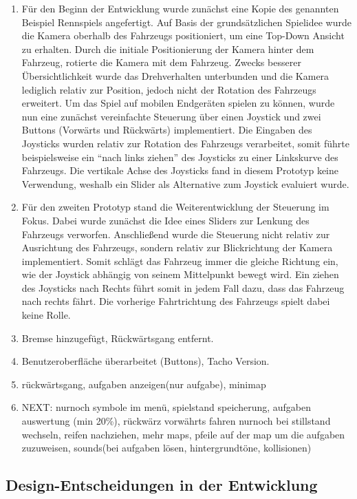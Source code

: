 	\begin{enumerate}[label=Prototyp \arabic*]
		\item{Für den Beginn der Entwicklung wurde zunächst eine Kopie des genannten Beispiel Rennspiels angefertigt. Auf Basis der grundsätzlichen Spielidee wurde die Kamera oberhalb des Fahrzeugs positioniert, um eine Top-Down Ansicht zu erhalten. Durch die initiale Positionierung der Kamera hinter dem Fahrzeug, rotierte die Kamera mit dem Fahrzeug. Zwecks besserer Übersichtlichkeit wurde das Drehverhalten unterbunden und die Kamera lediglich relativ zur Position, jedoch nicht der Rotation des Fahrzeugs erweitert. Um das Spiel auf mobilen Endgeräten spielen zu können, wurde nun eine zunächst vereinfachte Steuerung über einen Joystick und zwei Buttons (Vorwärts und Rückwärts) implementiert. Die Eingaben des Joysticks wurden relativ zur Rotation des Fahrzeugs verarbeitet, somit führte beispielsweise ein \enquote{nach links ziehen} des Joysticks zu einer Linkskurve des Fahrzeugs. Die vertikale Achse des Joysticks fand in diesem Prototyp keine Verwendung, weshalb ein Slider als Alternative zum Joystick evaluiert wurde. }
		\item{Für den zweiten Prototyp stand die Weiterentwicklung der Steuerung im Fokus. Dabei wurde zunächst die Idee eines Sliders zur Lenkung des Fahrzeugs verworfen. Anschließend wurde die Steuerung nicht relativ zur Ausrichtung des Fahrzeugs, sondern relativ zur Blickrichtung der Kamera implementiert. Somit schlägt das Fahrzeug immer die gleiche Richtung ein, wie der Joystick abhängig von seinem Mittelpunkt bewegt wird. Ein ziehen des Joysticks nach Rechts führt somit in jedem Fall dazu, dass das Fahrzeug nach rechts fährt. Die vorherige Fahrtrichtung des Fahrzeugs spielt dabei keine Rolle. }
		\item{ Bremse hinzugefügt, Rückwärtsgang entfernt. }
		\item{ Benutzeroberfläche überarbeitet (Buttons), Tacho Version. }
		\item{ rückwärtsgang, aufgaben anzeigen(nur aufgabe), minimap }
		\item{NEXT: nurnoch symbole im menü, spielstand speicherung, aufgaben auswertung (min 20\%), rückwärz vorwährts fahren nurnoch bei stillstand wechseln, reifen nachziehen, mehr maps, pfeile auf der map um die aufgaben zuzuweisen, sounds(bei aufgaben lösen, hintergrundtöne, kollisionen) }
	\end{enumerate}
\subsection{Design-Entscheidungen in der Entwicklung}
